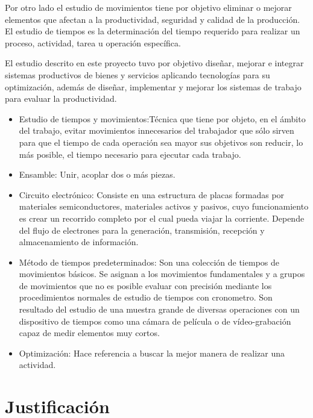          Por otro lado el estudio de movimientos tiene por objetivo eliminar o mejorar elementos que afectan a la productividad, seguridad y calidad de la producción. El estudio de tiempos es la determinación del tiempo requerido para realizar un proceso, actividad, tarea u operación específica.\cite{parra2020analisis}
    
         El estudio descrito en este proyecto tuvo por objetivo diseñar, mejorar e integrar sistemas productivos de bienes y servicios aplicando tecnologías para su optimización, además de diseñar, implementar y mejorar los sistemas de trabajo para evaluar la productividad.
    \begin{itemize}
    
     \item Estudio de  tiempos y movimientos:Técnica que tiene por objeto, en el ámbito del trabajo, evitar movimientos innecesarios del trabajador que sólo sirven para que el tiempo de cada operación sea mayor sus objetivos son reducir, lo más posible, el tiempo necesario para ejecutar cada trabajo.\cite{patent}
     \item Ensamble: Unir, acoplar dos o más piezas.\cite{RAE}
     \item Circuito electrónico: Consiste en una estructura de placas formadas por materiales semiconductores, materiales activos y pasivos, cuyo funcionamiento es crear un recorrido completo por el cual pueda viajar la corriente. Depende del flujo de electrones para la generación, transmisión, recepción y almacenamiento de información.\cite{thomas2007principios}
     \item Método de tiempos predeterminados: Son una colección de tiempos de movimientos básicos. Se asignan a los movimientos fundamentales y a grupos de movimientos que no es posible evaluar con precisión mediante los procedimientos normales de estudio de tiempos con cronometro. Son resultado del estudio de una muestra grande de diversas operaciones con un dispositivo de tiempos como una cámara de película o de vídeo-grabación capaz de medir elementos muy cortos. \cite{niebel1980ingenieria}
     \item Optimización: Hace referencia a buscar la mejor manera de realizar una actividad.\cite{vidalesaplicacion}
     
     \end{itemize}
    \section{Justificación}
    
